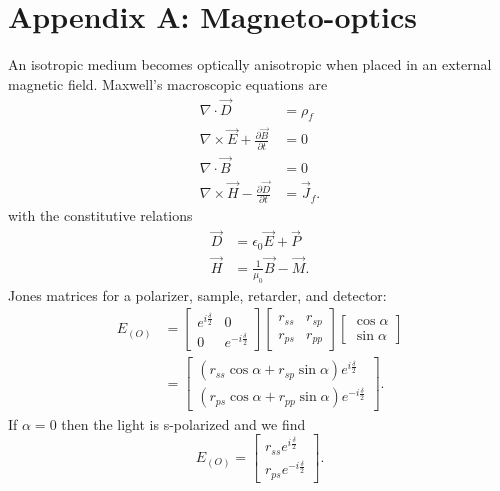 \documentclass{article}
\begin{document}
\appendix
\section{Appendix A: Magneto-optics}
An isotropic medium becomes optically anisotropic when placed in an external magnetic field.
%
Maxwell's macroscopic equations are
\begin{align}
\nabla \cdot \vec{D} &= \rho_{f} \\
\nabla \times \vec{E} + \frac{\partial \vec{B}}{\partial t} &= 0 \\
\nabla \cdot \vec{B} &= 0 \\
\nabla \times \vec{H} - \frac{\partial \vec{D}}{\partial t} &= \vec{J}_{f}.
\end{align}
with the constitutive relations
\begin{align}
\vec{D} &= \epsilon_{0} \vec{E} + \vec{P} \\
\vec{H} &= \frac{1}{\mu_{0}} \vec{B} - \vec{M}.
\end{align}
%
Jones matrices for a polarizer, sample, retarder, and detector:
\begin{align}
E_{(O)} &= \left[ \begin{matrix} e^{i \frac{\delta}{2}}&0\\ 0&e^{-i \frac{\delta}{2}} \end{matrix} \right] \left[ \begin{matrix} r_{ss}&r_{sp}\\ r_{ps}&r_{pp} \end{matrix} \right] \left[ \begin{matrix} \cos{\alpha}\\ \sin{\alpha} \end{matrix} \right] \\
&= \left[ \begin{matrix}(r_{ss} \cos{\alpha} + r_{sp} \sin{\alpha}) e^{i \frac{\delta}{2}} \\(r_{ps} \cos{\alpha} + r_{pp} \sin{\alpha}) e^{-i \frac{\delta}{2}} \end{matrix} \right].
\end{align}
If $\alpha = 0$ then the light is s-polarized and we find
\begin{equation}
E_{(O)} = \left[ \begin{matrix} r_{ss} e^{i \frac{\delta}{2}}\\ r_{ps} e^{-i \frac{\delta}{2}} \end{matrix} \right].
\end{equation}
\end{document}
